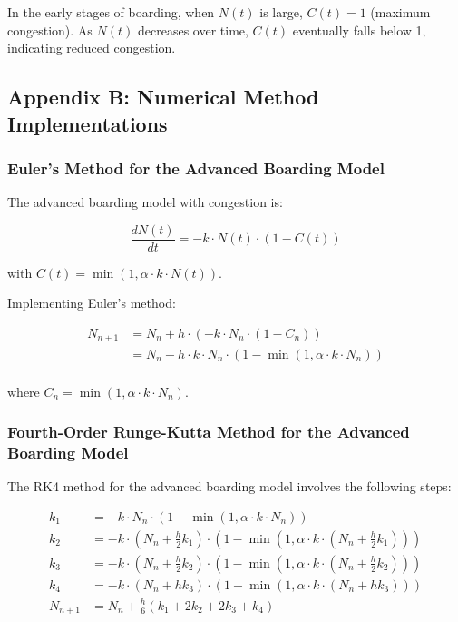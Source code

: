 \documentclass[12pt,a4paper]{article}
\begin{document}
In the early stages of boarding, when $N(t)$ is large, $C(t) = 1$ (maximum congestion). As $N(t)$ decreases over time, $C(t)$ eventually falls below 1, indicating reduced congestion.

\subsection{Appendix B: Numerical Method Implementations}

\subsubsection{Euler's Method for the Advanced Boarding Model}

The advanced boarding model with congestion is:

\begin{equation}
\frac{dN(t)}{dt} = -k \cdot N(t) \cdot (1 - C(t))
\end{equation}

with $C(t) = \min\left(1, \alpha \cdot k \cdot N(t) \right)$.

Implementing Euler's method:

\begin{align}
N_{n+1} &= N_n + h \cdot (-k \cdot N_n \cdot (1 - C_n)) \\
&= N_n - h \cdot k \cdot N_n \cdot (1 - \min(1, \alpha \cdot k \cdot N_n)) \\
\end{align}

where $C_n = \min(1, \alpha \cdot k \cdot N_n)$.

\subsubsection{Fourth-Order Runge-Kutta Method for the Advanced Boarding Model}

The RK4 method for the advanced boarding model involves the following steps:

\begin{align}
k_1 &= -k \cdot N_n \cdot (1 - \min(1, \alpha \cdot k \cdot N_n)) \\
k_2 &= -k \cdot (N_n + \frac{h}{2} k_1) \cdot (1 - \min(1, \alpha \cdot k \cdot (N_n + \frac{h}{2} k_1))) \\
k_3 &= -k \cdot (N_n + \frac{h}{2} k_2) \cdot (1 - \min(1, \alpha \cdot k \cdot (N_n + \frac{h}{2} k_2))) \\
k_4 &= -k \cdot (N_n + h k_3) \cdot (1 - \min(1, \alpha \cdot k \cdot (N_n + h k_3))) \\
N_{n+1} &= N_n + \frac{h}{6}(k_1 + 2k_2 + 2k_3 + k_4)
\end{align}
\end{document}
